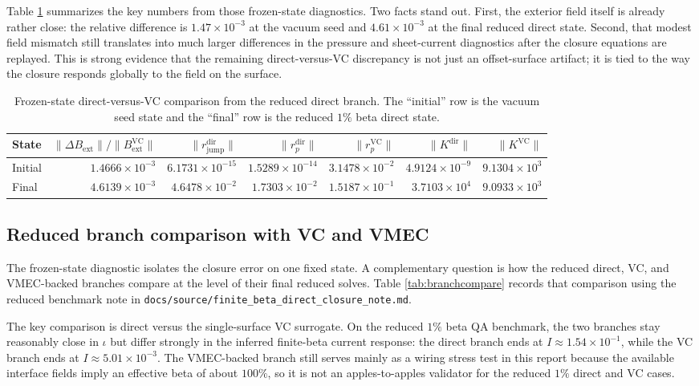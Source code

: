 \documentclass[11pt]{article}
\begin{document}
Table \ref{tab:directvcfrozen} summarizes the key numbers from those frozen-state diagnostics. Two facts stand out. First, the exterior field itself is already rather close: the relative difference is $1.47 \times 10^{-3}$ at the vacuum seed and $4.61 \times 10^{-3}$ at the final reduced direct state. Second, that modest field mismatch still translates into much larger differences in the pressure and sheet-current diagnostics after the closure equations are replayed. This is strong evidence that the remaining direct-versus-VC discrepancy is not just an offset-surface artifact; it is tied to the way the closure responds globally to the field on the surface.

\begin{table}[H]
\centering
\caption{Frozen-state direct-versus-VC comparison from the reduced direct branch. The ``initial'' row is the vacuum seed state and the ``final'' row is the reduced $1\%$ beta direct state.}
\label{tab:directvcfrozen}
\begin{tabular}{lrrrrrr}
\toprule
State & $\|\Delta B_{\mathrm{ext}}\|/\|B_{\mathrm{ext}}^{\mathrm{VC}}\|$ & $\|r_{\mathrm{jump}}^{\mathrm{dir}}\|$ & $\|r_p^{\mathrm{dir}}\|$ & $\|r_p^{\mathrm{VC}}\|$ & $\|K^{\mathrm{dir}}\|$ & $\|K^{\mathrm{VC}}\|$ \\
\midrule
Initial & $1.4666 \times 10^{-3}$ & $6.1731 \times 10^{-15}$ & $1.5289 \times 10^{-14}$ & $3.1478 \times 10^{-2}$ & $4.9124 \times 10^{-9}$ & $9.1304 \times 10^{3}$ \\
Final & $4.6139 \times 10^{-3}$ & $4.6478 \times 10^{-2}$ & $1.7303 \times 10^{-2}$ & $1.5187 \times 10^{-1}$ & $3.7103 \times 10^{4}$ & $9.0933 \times 10^{3}$ \\
\bottomrule
\end{tabular}
\end{table}

\subsection{Reduced branch comparison with VC and VMEC}
The frozen-state diagnostic isolates the closure error on one fixed state. A complementary question is how the reduced direct, VC, and VMEC-backed branches compare at the level of their final reduced solves. Table \ref{tab:branchcompare} records that comparison using the reduced benchmark note in \texttt{docs/source/finite\_beta\_direct\_closure\_note.md}.

The key comparison is direct versus the single-surface VC surrogate. On the reduced $1\%$ beta QA benchmark, the two branches stay reasonably close in $\iota$ but differ strongly in the inferred finite-beta current response: the direct branch ends at $I \approx 1.54 \times 10^{-1}$, while the VC branch ends at $I \approx 5.01 \times 10^{-3}$. The VMEC-backed branch still serves mainly as a wiring stress test in this report because the available interface fields imply an effective beta of about $100\%$, so it is not an apples-to-apples validator for the reduced $1\%$ direct and VC cases.
\end{document}

